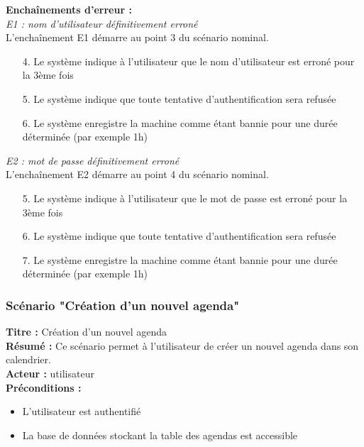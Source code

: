 \documentclass[12pt , a4paper]{article}
\begin{document}
\noindent\textbf{Encha\^inements d'erreur :}\\
\noindent\textit{E1 : nom d'utilisateur définitivement erroné}\\
L'encha\^inement E1 démarre au point 3 du scénario nominal.
\begin{enumerate}
\item[4.] Le système indique à l'utilisateur que le nom d'utilisateur est erroné pour la 3ème fois
\item[5.] Le système indique que toute tentative d'authentification sera refusée
\item[6.] Le système enregistre la machine comme étant bannie pour une durée déterminée (par exemple 1h)
\end{enumerate}


\noindent\textit{E2 : mot de passe définitivement erroné}\\
L'encha\^inement E2 démarre au point 4 du scénario nominal.
\begin{enumerate}
\item[5.] Le système indique à l'utilisateur que le mot de passe est erroné pour la 3ème fois
\item[6.] Le système indique que toute tentative d'authentification sera refusée
\item[7.] Le système enregistre la machine comme étant bannie pour une durée déterminée (par exemple 1h)
\end{enumerate}

\newpage
\subsubsection{Scénario "Création d'un nouvel agenda"}

\noindent\textbf{Titre : } Création d’un nouvel agenda\\
\textbf{Résumé : } Ce scénario permet à l’utilisateur de créer un nouvel agenda dans son calendrier.\\
\textbf{Acteur : }utilisateur\\

\noindent\textbf{Préconditions :}
\begin{itemize}
\item L'utilisateur est authentifié
\item La base de données stockant la table des agendas est accessible\\
\end{itemize}
\end{document}
